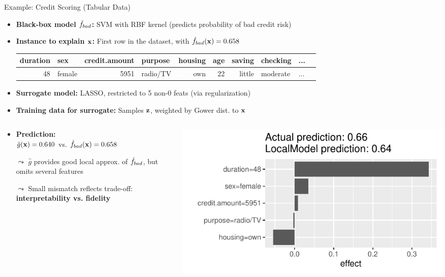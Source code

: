 \documentclass[10pt,compress,t,notes=noshow, xcolor=table]{beamer}
\newcommand{\gh}{\hat{g}}
\begin{document}
\begin{frame}{Example: Credit Scoring (Tabular Data)}

\begin{itemize}
  \item \textbf{Black-box model \( \hat{f}_{bad} \):} SVM with RBF kernel (predicts probability of bad credit risk)
  \item \textbf{Instance to explain \( \mathbf{x} \):} First row in the dataset, with \( \hat{f}_{bad}(\mathbf{x}) = 0.658 \)
{\scriptsize
\begin{tabular}{r l r l r r r l l l}
  \hline
  duration & sex & credit.amount & purpose & housing & age & saving & checking & ... \\
  \hline
  48 & female & 5951 & radio/TV & own & 22 & little & moderate & ... \\
  \hline
\end{tabular}

}
  \item \textbf{Surrogate model:} LASSO, restricted to 5 non-0 feats (via regularization)
  \item \textbf{Training data for surrogate:} Samples \( \mathbf{z} \), weighted by Gower dist. to \( \mathbf{x} \)
\end{itemize}
\pause
\begin{columns}[T,onlytextwidth]
  \begin{column}{0.5\textwidth}
    \begin{itemize}
      \item \textbf{Prediction:} \\
      \( \gh(\xv) = 0.640 \) vs. \( \hat{f}_{bad}(\mathbf{x}) = 0.658 \)
      \item[$\leadsto$] $\gh$ provides good local approx. of $\hat{f}_{bad}$, but omits several features 
      \item[$\leadsto$] Small mismatch reflects trade-off:\\
      \textbf{interpretability vs. fidelity}
    \end{itemize}
  \end{column}

  \begin{column}{0.5\textwidth}
    \includegraphics[width=\linewidth]{figure/lime_credit.pdf}%
  \end{column}


\end{columns}
\end{frame}
\end{document}
